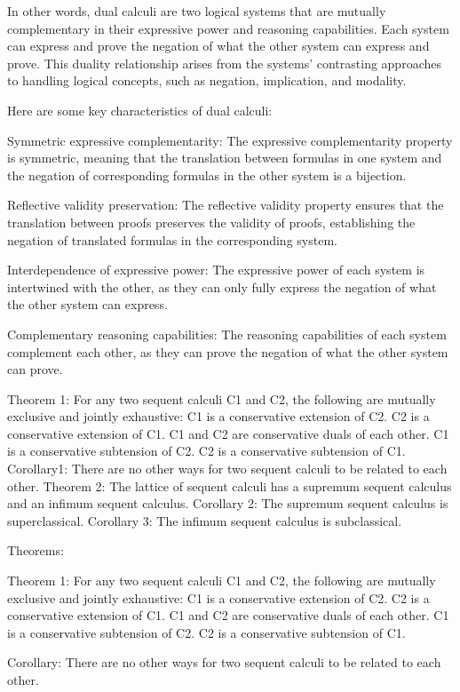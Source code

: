 In other words, dual calculi are two logical systems that are mutually complementary in their expressive power and reasoning capabilities. Each system can express and prove the negation of what the other system can express and prove. This duality relationship arises from the systems' contrasting approaches to handling logical concepts, such as negation, implication, and modality.

Here are some key characteristics of dual calculi:

Symmetric expressive complementarity: The expressive complementarity property is symmetric, meaning that the translation between formulas in one system and the negation of corresponding formulas in the other system is a bijection.

Reflective validity preservation: The reflective validity property ensures that the translation between proofs preserves the validity of proofs, establishing the negation of translated formulas in the corresponding system.

Interdependence of expressive power: The expressive power of each system is intertwined with the other, as they can only fully express the negation of what the other system can express.

Complementary reasoning capabilities: The reasoning capabilities of each system complement each other, as they can prove the negation of what the other system can prove.


Theorem 1: For any two sequent calculi C1 and C2, the following are mutually exclusive and jointly exhaustive:
C1 is a conservative extension of C2.
C2 is a conservative extension of C1.
C1 and C2 are conservative duals of each other.
C1 is a conservative subtension of C2.
C2 is a conservative subtension of C1.
Corollary1: There are no other ways for two sequent calculi to be related to each other.
Theorem 2: The lattice of sequent calculi has a supremum sequent calculus and an infimum sequent calculus.
Corollary 2: The supremum sequent calculus is superclassical.
Corollary 3: The infimum sequent calculus is subclassical.

Theorems:

Theorem 1: For any two sequent calculi C1 and C2, the following are mutually exclusive and jointly exhaustive:
C1 is a conservative extension of C2.
C2 is a conservative extension of C1.
C1 and C2 are conservative duals of each other.
C1 is a conservative subtension of C2.
C2 is a conservative subtension of C1.

Corollary: There are no other ways for two sequent calculi to be related to each other.

